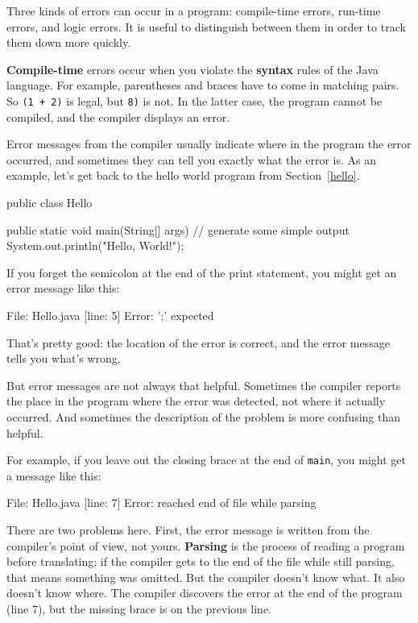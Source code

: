 \documentclass[12pt]{book}
\theoremstyle{exercise}
\newcommand{\java}[1]{\verb"#1"}
\begin{document}

Three kinds of errors can occur in a program: compile-time errors, run-time errors, and logic errors.
It is useful to distinguish between them in order to track them down more quickly.


{\bf Compile-time} errors occur when you violate the {\bf syntax} rules of the Java language.
For example, parentheses and braces have to come in matching pairs.
So \java{(1 + 2)} is legal, but \java{8)} is not.
In the latter case, the program cannot be compiled, and the compiler displays an error.


Error messages from the compiler usually indicate where in the program the error occurred, and sometimes they can tell you exactly what the error is.
As an example, let's get back to the hello world program from Section~\ref{hello}.

\begin{code}
public class Hello {

    public static void main(String[] args) {
        // generate some simple output
        System.out.println("Hello, World!");
    }
}
\end{code}

If you forget the semicolon at the end of the print statement, you might get an error message like this:

\begin{stdout}
File: Hello.java  [line: 5]
Error: ';' expected
\end{stdout}

That's pretty good: the location of the error is correct, and the error message tells you what's wrong.

But error messages are not always that helpful.
Sometimes the compiler reports the place in the program where the error was detected, not where it actually occurred.
And sometimes the description of the problem is more confusing than helpful.

For example, if you leave out the closing brace at the end of \java{main}, you might get a message like this:

\begin{stdout}
File: Hello.java  [line: 7]
Error: reached end of file while parsing
\end{stdout}

There are two problems here.
First, the error message is written from the compiler's point of view, not yours.
{\bf Parsing} is the process of reading a program before translating; if the compiler gets to the end of the file while still parsing, that means something was omitted.
But the compiler doesn't know what.
It also doesn't know where.
The compiler discovers the error at the end of the program (line 7), but the missing brace is on the previous line.
\end{document}
